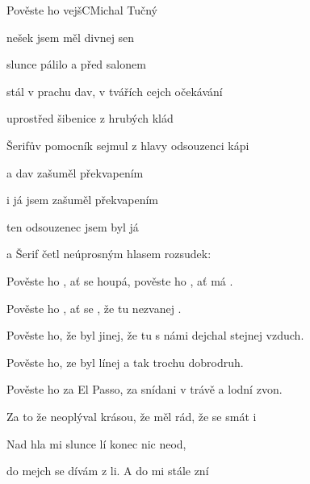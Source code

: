 \begin{song}{Pověste ho vejš}{C}{Michal Tučný}

\begin{SBChorus*}

nešek jsem měl divnej sen

slunce pálilo a před salonem

stál v prachu dav, v tvářích cejch očekávání

uprostřed šibenice z hrubých klád

Šerifův pomocník sejmul z hlavy odsouzenci kápi

a dav zašuměl překvapením

i já jsem zašuměl překvapením

ten odsouzenec jsem byl já

a Šerif četl neúprosným hlasem rozsudek:

\end{SBChorus*}

\begin{SBVerse}

Pověste ho , ať se houpá, pověste ho , ať má .

Pověste ho , ať se , že tu  nezvanej .

\end{SBVerse}

\begin{SBVerse}

Pověste ho, že byl jinej, že tu s námi dejchal stejnej vzduch.

Pověste ho, ze byl línej a tak trochu dobrodruh.

\end{SBVerse}

\begin{SBVerse}

Pověste ho za El Passo, za snídani v trávě a lodní zvon.

Za to že neoplýval krásou, že měl  rád, že se  smát i 

\end{SBVerse}

\begin{SBChorus}

Nad hla mi slunce lí konec  nic neod,

do mejch  se dívám z li. A do  mi stále zní


\end{SBChorus}
\end{song}
